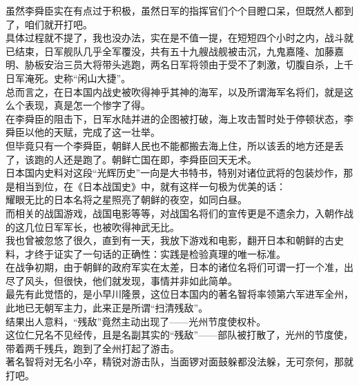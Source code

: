 \begin{multicols}{\theparacolNo}
虽然李舜臣实在有点过于积极，虽然日军的指挥官们个个目瞪口呆，但既然人都到了，咱们就开打吧。\\

具体过程就不提了，我也没办法，实在是不值一提，在短短四个小时之内，战斗就已结束，日军舰队几乎全军覆没，共有五十九艘战舰被击沉，九鬼嘉隆、加藤嘉明、胁板安治三员大将带头逃跑，两名日军将领由于受不了刺激，切腹自杀，上千日军淹死。史称“闲山大捷”。\\

总而言之，在日本国内战史被吹得神乎其神的海军，以及所谓海军名将们，就是这么个表现，真是怎一个惨字了得。\\

在李舜臣的阻击下，日军水陆并进的企图被打破，海上攻击暂时处于停顿状态，李舜臣以他的天赋，完成了这一壮举。\\

但毕竟只有一个李舜臣，朝鲜人民也不能都搬去海上住，所以该丢的地方还是丢了，该跑的人还是跑了。朝鲜亡国在即，李舜臣回天无术。\\

日本国内史料对这段“光辉历史”一向是大书特书，特别对诸位武将的包装炒作，那是相当到位，在《日本战国史》中，就有这样一句极为优美的话：\\

耀眼无比的日本名将之星照亮了朝鲜的夜空，如同白昼。\\

而相关的战国游戏，战国电影等等，对战国名将们的宣传更是不遗余力，入朝作战的这几位日军军长，也被吹得神武无比。\\

我也曾被忽悠了很久，直到有一天，我放下游戏和电影，翻开日本和朝鲜的古史料，才终于证实了一句话的正确性：实践是检验真理的唯一标准。\\

在战争初期，由于朝鲜的政府军实在太差，日本的诸位名将们可谓一打一个准，出尽了风头，但很快，他们就发现，事情并非如此简单。\\

最先有此觉悟的，是小早川隆景，这位日本国内的著名智将率领第六军进军全州，此地已无朝军主力，此来正是所谓“扫清残敌”。\\

结果出人意料，“残敌”竟然主动出现了——光州节度使权朴。\\

这位仁兄名不见经传，且是名副其实的“残敌”——部队被打散了，光州的节度使，带着两千残兵，跑到了全州打起了游击。\\

著名智将对无名小卒，精锐对游击队，当面锣对面鼓躲都没法躲，无可奈何，那就打吧。\\


\end{multicols}
